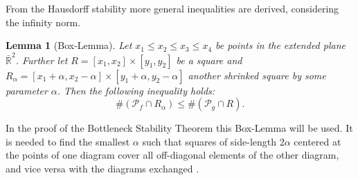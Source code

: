 \documentclass[journal]{IEEEtran}
\newtheorem{lemma}{Lemma}[definition]
\begin{document}
From the Hausdorff stability more general inequalities are derived, considering the infinity norm.

\begin{lemma}[Box-Lemma]
\label{boxlemma}
Let $x_1 \leq x_2 \leq x_3 \leq x_4$ be points in the extended plane $\bar{\mathbb{R}}^2$. Further let $R = [x_1,x_2] \times [y_1,y_2]$ be a square and $R_\alpha = [x_1+\alpha,x_2-\alpha] \times [y_1+\alpha,y_2-\alpha]$ another shrinked square by some parameter $\alpha$. Then the following inequality holds:
\begin{equation}
\#\left( \mathcal{P}_f \cap R_\alpha \right) \leq \#\left(\mathcal{P}_g \cap R \right).
\end{equation}
\end{lemma}

In the proof of the Bottleneck Stability Theorem this Box-Lemma will be used. It is needed to find the smallest $\alpha$ such that squares of side-length $2 \alpha$ centered at the points of one diagram cover all off-diagonal elements of the other diagram, and vice versa with the diagrams exchanged \cite{Cohen-SteinerEH07}.
\end{document}
